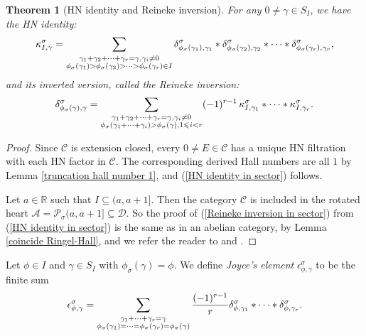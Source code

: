 \documentclass[a4paper,12pt]{amsart}
\numberwithin{equation}{section}
\newtheorem{theorem}{Theorem}[section]
\newcommand{\1}{\mathbf{1}}
\begin{document}
\begin{theorem}[HN identity and Reineke inversion]
    For any $0\neq\gamma\in S_I$, we have the \emph{HN identity}:
    \begin{equation}\label{HN identity in sector}
        \kappa^\sigma_{I,\gamma}=\sum_{\begin{subarray}{c}
         \\  {\gamma_1+\gamma_2+\dots+\gamma_r=\gamma},\gamma_i\neq0\\{\phi_\sigma(\gamma_1)>\phi_\sigma(\gamma_2)>\dots>\phi_\sigma(\gamma_r)\in I}
    \end{subarray}}\delta^\sigma_{\phi_\sigma(\gamma_1),\gamma_1}*\delta^\sigma_{\phi_\sigma(\gamma_2),\gamma_2}*\dots*\delta^\sigma_{\phi_\sigma(\gamma_r),\gamma_r},
    \end{equation}
    and its inverted version, called the \emph{Reineke inversion}:
    \begin{equation}\label{Reineke inversion in sector}
        \delta^\sigma_{\phi_\sigma(\gamma),\gamma}=\sum_{\begin{subarray}{c}
        \gamma_1+\gamma_2+\dots+\gamma_r=\gamma,\gamma_i\neq0\\\phi_\sigma(\gamma_1+\dots+\gamma_i)>\phi_\sigma(\gamma),1\leqslant i<r\\
    \end{subarray}}(-1)^{r-1}\,\kappa^\sigma_{I,\gamma_1}*\dots*\kappa^\sigma_{I,\gamma_r}.
    \end{equation}
\end{theorem}
\begin{proof}
    Since $\mathcal{C}$ is extension closed, every $0\neq E\in\mathcal{C}$ has a unique HN filtration with each HN factor in $\mathcal{C}$. The corresponding derived Hall numbers are all $1$ by Lemma \ref{truncation hall number 1}, and (\ref{HN identity in sector}) follows.

    Let $a\in\mathbb{R}$ such that $I\subseteq(a,a+1]$. Then the category $\mathcal{C}$ is included in the rotated heart $\mathcal{A}=\mathcal{P}_\sigma(a,a+1]\subseteq\mathcal{D}$. So the proof of (\ref{Reineke inversion in sector}) from (\ref{HN identity in sector}) is the same as in an abelian category, by Lemma \ref{coincide Ringel-Hall}, and we refer the reader to \cite[Theorem 5.4]{BT2012} and \cite[Theorem 5.1]{Rei2003}.
\end{proof}
Let $\phi\in I$ and $\gamma\in S_I$ with $\phi_\sigma(\gamma)=\phi$. We define \emph{Joyce's element} $\epsilon^\sigma_{\phi,\gamma}$ to be the finite sum
\begin{equation}\label{Joyce's element}
    \epsilon^\sigma_{\phi,\gamma}=\sum_{\begin{subarray}{c}
    \\ \gamma_1+\dots+\gamma_r=\gamma\\
   \phi_\sigma(\gamma_1)=\dots=\phi_\sigma(\gamma_r)=\phi_\sigma(\gamma) 
\end{subarray}}\frac{(-1)^{r-1}}{r}\delta^\sigma_{\phi,\gamma_1}*\dots*\delta^\sigma_{\phi,\gamma_r}.
\end{equation}
\end{document}
